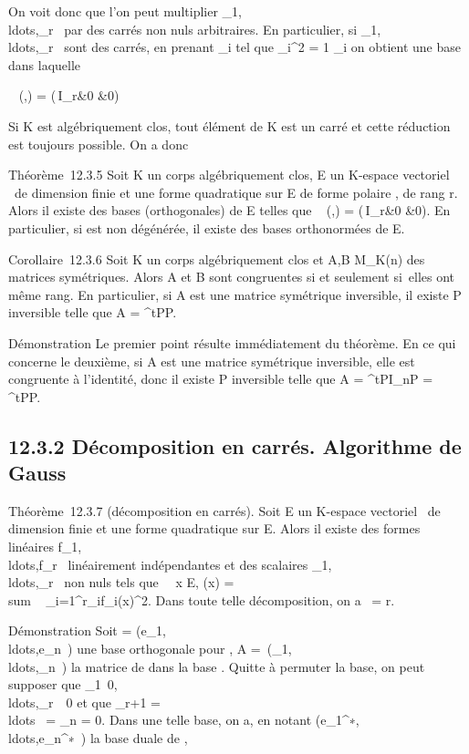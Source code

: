 \documentclass[]{article}
\begin{document}
On voit donc que l'on peut multiplier
\alpha_1,\\ldots,\alpha_r~
par des carrés non nuls arbitraires. En particulier, si
\alpha_1,\\ldots,\alpha_r~
sont des carrés, en prenant \lambda_i tel que \lambda_i^2
= 1 \over \alpha_i on obtient une base dans
laquelle

\mathrmMat~ (\phi,) =
\left
(\matrix\,I_r&0
 &0\right )

Si K est algébriquement clos, tout élément de K est un carré et cette
réduction est toujours possible. On a donc

Théorème~12.3.5 Soit K un corps algébriquement clos, E un K-espace
vectoriel ~de dimension finie et \Phi une forme quadratique sur E de forme
polaire \phi, de rang r. Alors il existe des bases (orthogonales) de E
telles que \mathrmMat~ (\phi,)
= \left
(\matrix\,I_r&0
 &0\right ). En particulier, si \Phi
est non dégénérée, il existe des bases orthonormées de E.

Corollaire~12.3.6 Soit K un corps algébriquement clos et A,B \in
M_K(n) des matrices symétriques. Alors A et B sont congruentes
si et seulement si~elles ont même rang. En particulier, si A est une
matrice symétrique inversible, il existe P inversible telle que A =
^tPP.

Démonstration Le premier point résulte immédiatement du théorème. En ce
qui concerne le deuxième, si A est une matrice symétrique inversible,
elle est congruente à l'identité, donc il existe P inversible telle que
A = ^tPI_nP = ^tPP.

\subsection{12.3.2 Décomposition en carrés. Algorithme de Gauss}

Théorème~12.3.7 (décomposition en carrés). Soit E un K-espace vectoriel
~de dimension finie et \Phi une forme quadratique sur E. Alors il existe
des formes linéaires
f_1,\\ldots,f_r~
linéairement indépendantes et des scalaires
\alpha_1,\\ldots,\alpha_r~
non nuls tels que \forall~~x \in E, \Phi(x)
= \\sum ~
_i=1^r\alpha_if_i(x)^2. Dans toute
telle décomposition, on a
\mathrmrg~\Phi = r.

Démonstration Soit  =
(e_1,\\ldots,e_n~)
une base orthogonale pour \Phi, A =\
\mathrmdiag(\alpha_1,\\ldots,\alpha_n~)
la matrice de \Phi dans la base . Quitte à permuter la base, on peut
supposer que
\alpha_1\neq~0,\\ldots,\alpha_r\mathrel\neq~~0
et que \alpha_r+1 =
\\ldots~ =
\alpha_n = 0. Dans une telle base, on a, en notant
(e_1^∗,\\ldots,e_n^∗~)
la base duale de ,
\end{document}
